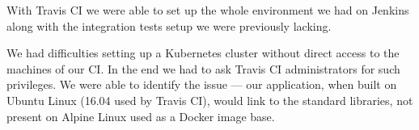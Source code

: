 With Travis CI we were able to set up the whole environment we had on Jenkins along with the
integration tests setup we were previously lacking.

We had difficulties setting up a Kubernetes cluster without direct access to the machines of our CI.
In the end we had to ask Travis CI
administrators for such privileges. We were able to identify the issue --- our application, when
built on Ubuntu Linux (16.04 used by Travis CI), would link to the standard libraries, not present
on Alpine Linux used as a Docker image base.
